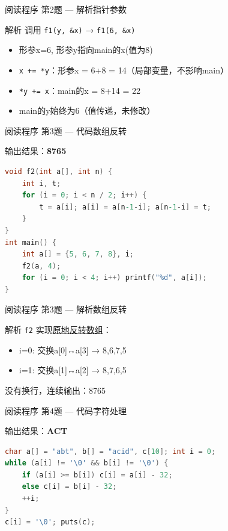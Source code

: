 \begin{frame}{阅读程序 第2题 --- 解析}{指针参数}
    \begin{alertblock}{解析}
        \footnotesize 调用 \texttt{f1(y, \&x)} → \texttt{f1(6, \&x)}
        \begin{itemize}
            \setlength{\itemsep}{0pt}
            \item 形参x=6, 形参y指向main的x(值为8)
            \item \texttt{x += *y}：形参x = 6+8 = 14（局部变量，不影响main）
            \item \texttt{*y += x}：main的x = 8+14 = 22
            \item main的y始终为6（值传递，未修改）
        \end{itemize}
    \end{alertblock}
\end{frame}

\begin{frame}[fragile]{阅读程序 第3题 — 代码}{数组反转}
    \begin{exampleblock}{输出结果：\textbf{8765}}
    \end{exampleblock}
    \begin{lstlisting}[language=C]
void f2(int a[], int n) {
    int i, t;
    for (i = 0; i < n / 2; i++) {
        t = a[i]; a[i] = a[n-1-i]; a[n-1-i] = t;
    }
}
int main() {
    int a[] = {5, 6, 7, 8}, i;
    f2(a, 4);
    for (i = 0; i < 4; i++) printf("%d", a[i]);
}
\end{lstlisting}
\end{frame}

\begin{frame}[fragile]{阅读程序 第3题 — 解析}{数组反转}
    \begin{alertblock}{解析}
        \footnotesize \texttt{f2} 实现\underline{原地反转数组}：
        \begin{itemize}
            \setlength{\itemsep}{0pt}
            \item i=0: 交换a[0]↔a[3] → {8,6,7,5}
            \item i=1: 交换a[1]↔a[2] → {8,7,6,5}
        \end{itemize}
        没有换行，连续输出：8765
    \end{alertblock}
\end{frame}

\begin{frame}[fragile]{阅读程序 第4题 --- 代码}{字符处理}
    \begin{exampleblock}{输出结果：\textbf{ACT}}
    \end{exampleblock}
    \begin{lstlisting}[language=C,basicstyle=\scriptsize\ttfamily]
char a[] = "abt", b[] = "acid", c[10]; int i = 0;
while (a[i] != '\0' && b[i] != '\0') {
    if (a[i] >= b[i]) c[i] = a[i] - 32;
    else c[i] = b[i] - 32;
    ++i;
}
c[i] = '\0'; puts(c);
\end{lstlisting}
\end{frame}

